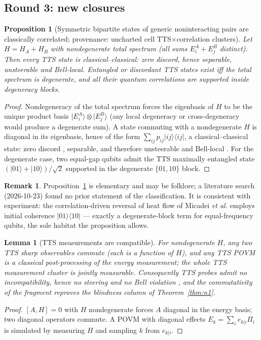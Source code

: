 \documentclass[11pt,a4paper]{article}
\newtheorem{proposition}{Proposition}
\newtheorem{lemma}{Lemma}
\theoremstyle{definition}
\newtheorem{remark}{Remark}
\newcommand{\ket}[1]{\lvert #1 \rangle}
\newcommand{\bra}[1]{\langle #1 \rvert}
\newcommand{\proj}[1]{\lvert #1 \rangle\!\langle #1 \rvert}
\begin{document}
\subsection{Round 3: new closures}

\begin{proposition}[Symmetric bipartite states of generic noninteracting pairs
are classically correlated; provenance: uncharted cell
TTS$\times$correlation clusters]\label{prop:r1}
Let $H=H_A+H_B$ with nondegenerate total spectrum (all sums $E^A_i+E^B_j$
distinct). Then every TTS state is classical--classical: zero discord, hence
separable, unsteerable and Bell-local. Entangled or discordant TTS states
exist iff the total spectrum is degenerate, and all their quantum correlations
are supported inside degeneracy blocks.
\end{proposition}
\begin{proof}
Nondegeneracy of the total spectrum forces the eigenbasis of $H$ to be the
unique product basis $\ket{E^A_i}\otimes\ket{E^B_j}$ (any local degeneracy or
cross-degeneracy would produce a degenerate sum). A state commuting with a
nondegenerate $H$ is diagonal in its eigenbasis, hence of the form
$\sum_{ij}p_{ij}\proj{ij}$, a classical--classical state: zero discord
\cite{ollivier2001,henderson2001}, separable, and therefore unsteerable and
Bell-local \cite{wiseman2007}. For the degenerate case, two equal-gap qubits
admit the TTS maximally entangled state
$(\ket{01}+\ket{10})/\sqrt2$ supported in the degenerate $\{01,10\}$ block.
\end{proof}

\begin{remark}
Proposition~\ref{prop:r1} is elementary and may be folklore; a literature
search (2026-10-23) found no prior statement of the classification. It is consistent with experiment: the
correlation-driven reversal of heat flow of Micadei \emph{et al.}
\cite{micadei2019} employs initial coherence $\ket{01}\!\bra{10}$ --- exactly
a degenerate-block term for equal-frequency qubits, the sole habitat the
proposition allows.
\end{remark}

\begin{lemma}[TTS measurements are compatible]\label{lem:r2}
For nondegenerate $H$, any two TTS sharp observables commute (each is a
function of $H$), and any TTS POVM is a classical post-processing of the
energy measurement; the whole TTS measurement cluster is jointly measurable.
Consequently TTS probes admit no incompatibility, hence no steering
\cite{quintino2014,uola2014} and no Bell violation \cite{fine1982}, and the
commutativity of the fragment reproves the blindness column of
Theorem~\ref{thm:n1}.
\end{lemma}
\begin{proof}
$[A,H]=0$ with $H$ nondegenerate forces $A$ diagonal in the energy basis; two
diagonal operators commute. A POVM with diagonal effects
$E_k=\sum_i e_{k|i}\Pi_i$ is simulated by measuring $H$ and sampling $k$ from
$e_{k|i}$.
\end{proof}
\end{document}
